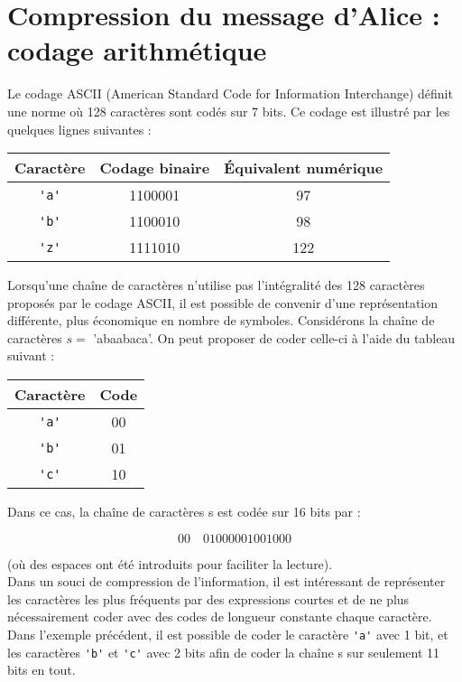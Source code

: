 \section{Compression du message d'Alice : codage arithmétique}
Le codage ASCII (American Standard Code for Information Interchange) définit une norme où 128 caractères sont codés sur 7 bits. Ce codage est illustré par les quelques lignes suivantes :

\begin{center}
\begin{tabular}{ccc}
\hline
\textbf{Caractère} & \textbf{Codage binaire} & \textbf{Équivalent numérique} \\
\hline
\lstinline{'a'} & 1100001 & 97 \\
\hline
\lstinline{'b'} & 1100010 & 98 \\
\hline
\lstinline{'z'} & 1111010 & 122 \\
\hline
\end{tabular}
\end{center}

Lorsqu'une chaîne de caractères n'utilise pas l'intégralité des 128 caractères proposés par le codage ASCII, il est possible de convenir d'une représentation différente, plus économique en nombre de symboles. Considérons la chaîne de caractères $s=$ 'abaabaca'. On peut proposer de coder celle-ci à l'aide du tableau suivant :

\begin{center}
\begin{tabular}{cc}
\hline
\textbf{Caractère} & \textbf{Code}\\
\hline
\lstinline{'a'} & 00 \\
\hline
\lstinline{'b'} & 01 \\
\hline
\lstinline{'c'} & 10 \\
\hline
\end{tabular}
\end{center}

Dans ce cas, la chaîne de caractères s est codée sur 16 bits par :

$$
00 \quad 01000001001000
$$

(où des espaces ont été introduits pour faciliter la lecture).\\
Dans un souci de compression de l'information, il est intéressant de représenter les caractères les plus fréquents par des expressions courtes et de ne plus nécessairement coder avec des codes de longueur constante chaque caractère. Dans l'exemple précédent, il est possible de coder le caractère \lstinline{'a'} avec 1 bit, et les caractères \lstinline{'b'} et \lstinline{'c'} avec 2 bits afin de coder la chaîne s sur seulement 11 bits en tout.

